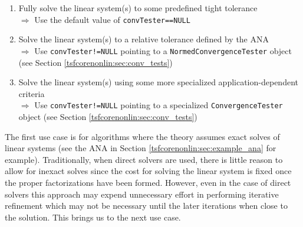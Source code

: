\begin{enumerate}
\item\label{tsfcorenonlin:lso:full_solves}
Fully solve the linear system(s) to some predefined tight tolerance\\
$\Rightarrow$ Use the default value of \texttt{convTester==NULL}
\item\label{tsfcorenonlin:lso:inexact_solves}
Solve the linear system(s) to a relative tolerance defined by the
ANA\\ $\Rightarrow$ Use \texttt{convTester!=NULL} pointing to a
\texttt{NormedConvergenceTester} object (see Section \ref{tsfcorenonlin:sec:conv_tests})
\item\label{tsfcorenonlin:lso:specialized_solves}
Solve the linear system(s) using some more specialized
application-dependent criteria\\ $\Rightarrow$ Use
\texttt{convTester!=NULL} pointing to a specialized
\texttt{ConvergenceTester} object (see Section \ref{tsfcorenonlin:sec:conv_tests})
\end{enumerate}

The first use case is for algorithms where the theory assumes exact
solves of linear systems (see the ANA in Section
\ref{tsfcorenonlin:sec:example_ana} for example).  Traditionally, when
direct solvers are used, there is little reason to allow for inexact
solves since the cost for solving the linear system is fixed once the
proper factorizations have been formed.  However, even in the case of
direct solvers this approach may expend unnecessary effort in
performing iterative refinement
\cite{ref:golub_van_loan_1996} which may not be necessary until the
later iterations when close to the solution.  This brings us to the
next use case.

